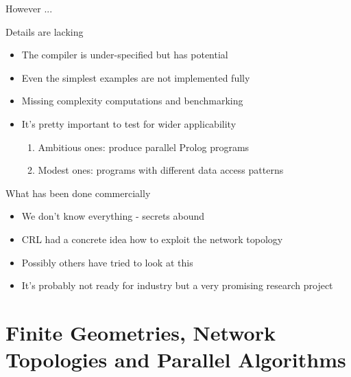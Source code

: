 \documentclass{beamer}
\begin{document}
\begin{frame}{However ...}
\begin{block}{Details are lacking}
\begin{itemize}
\item The compiler is under-specified but has potential
\item Even the simplest examples are not implemented fully
\item Missing complexity computations and benchmarking
\item It's pretty important to test for wider applicability
\begin{enumerate}
\item Ambitious ones: produce parallel Prolog programs
\item Modest ones: programs with different data access patterns
\end{enumerate}
\end{itemize}
\end{block}
\end{frame}

\begin{frame}{What has been done commercially}
\begin{itemize}
\item We don't know everything - secrets abound
\item CRL had a concrete idea how to exploit the network topology
\item Possibly others have tried to look at this
\item It's probably not ready for industry but a very promising research project
\end{itemize}
\end{frame}

\section{Finite Geometries, Network Topologies and Parallel Algorithms}  %
\end{document}

